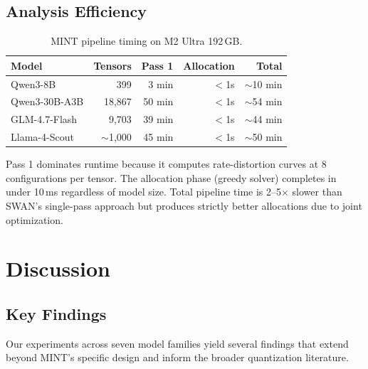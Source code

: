 \documentclass{article}
\begin{document}
\subsection{Analysis Efficiency}

\begin{table}[h]
\centering
\caption{MINT pipeline timing on M2 Ultra 192\,GB.}
\label{tab:timing}
\begin{tabular}{lrrrr}
\toprule
Model & Tensors & Pass 1 & Allocation & Total \\
\midrule
Qwen3-8B & 399 & 3 min & $<$1s & ${\sim}$10 min \\
Qwen3-30B-A3B & 18{,}867 & 50 min & $<$1s & ${\sim}$54 min \\
GLM-4.7-Flash & 9{,}703 & 39 min & $<$1s & ${\sim}$44 min \\
Llama-4-Scout & ${\sim}$1{,}000 & 45 min & $<$1s & ${\sim}$50 min \\
\bottomrule
\end{tabular}
\end{table}

Pass 1 dominates runtime because it computes rate-distortion curves at 8 configurations per tensor. The allocation phase (greedy solver) completes in under 10\,ms regardless of model size. Total pipeline time is 2--5$\times$ slower than SWAN's single-pass approach but produces strictly better allocations due to joint optimization.

\section{Discussion}
\label{sec:discussion}

\subsection{Key Findings}
\label{sec:key_findings}

Our experiments across seven model families yield several findings that extend beyond MINT's specific design and inform the broader quantization literature.
\end{document}
